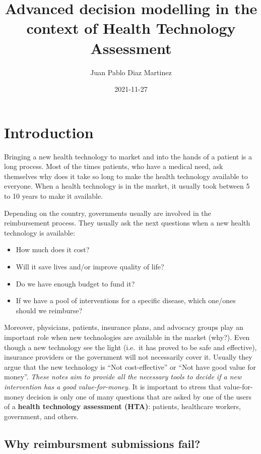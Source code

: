 \documentclass[
]{book}
\title{Advanced decision modelling in the context of Health Technology Assessment}
\author{Juan Pablo Diaz Martinez}
\date{2021-11-27}
\providecommand{\tightlist}{%
  \setlength{\itemsep}{0pt}\setlength{\parskip}{0pt}}
\begin{document}
\maketitle

{
\setcounter{tocdepth}{1}
\tableofcontents
}
\hypertarget{introduction}{%
\chapter*{Introduction}\label{introduction}}

Bringing a new health technology to market and into the hands of a patient is a long process. Most of the times patients, who have a medical need, ask themselves why does it take so long to make the health technology available to everyone. When a health technology is in the market, it usually took between 5 to 10 years to make
it available.

Depending on the country, governments usually are involved in the reimbursement process. They usually ask the next questions when a new health technology is available:

\begin{itemize}
\tightlist
\item
  How much does it cost?
\item
  Will it save lives and/or improve quality of life?
\item
  Do we have enough budget to fund it?
\item
  If we have a pool of interventions for a specific disease, which one/ones should we reimburse?
\end{itemize}

Moreover, physicians, patients, insurance plans, and advocacy groups play an important role when new technologies are available in the market (why?). Even though a new technology see the light (i.e.~it has proved to be safe and effective), insurance providers or the government will not necessarily cover it. Usually they argue that the new technology is ``Not cost-effective'' or ``Not have good value for money''. \emph{These notes aim to provide all the necessary tools to decide if a new intervention has a good value-for-money.} It is important to stress that value-for-money decision is only one of many questions that are asked by one of the users of a \textbf{health technology assessment (HTA)}: patients, healthcare workers, government, and others.

\hypertarget{why-reimbursment-submissions-fail}{%
\section*{Why reimbursment submissions fail?}\label{why-reimbursment-submissions-fail}}
\end{document}
